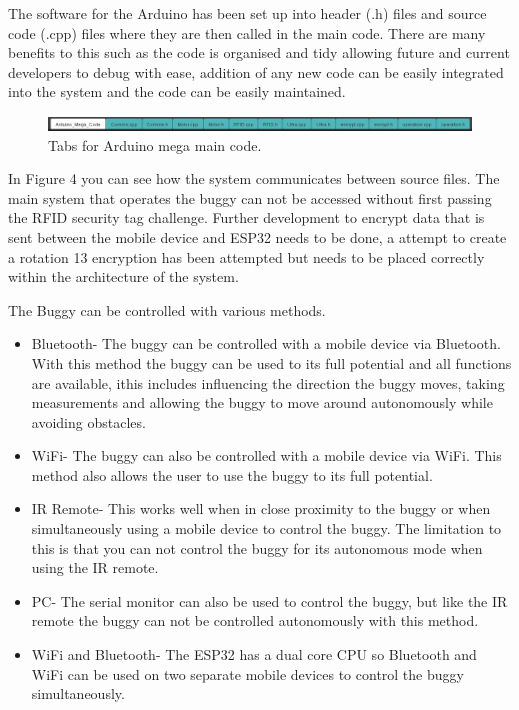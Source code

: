 \documentclass[8pt, a4paper]{article}
\begin{document}
The software for the Arduino has been set up into header (.h) files and source code (.cpp) files where they are then called in the main code. There are many benefits to this such as the code is organised and tidy allowing future and current developers to debug with ease, addition of any new code can be easily integrated into the system and the code can be easily maintained. 

\begin{figure}[H]
	\includegraphics[width=17cm]{tabs}
	\caption{Tabs for Arduino mega main code.}
\end{figure}

In Figure 4 you can see how the system communicates between source files. The main system that operates the buggy can not be accessed without first passing the RFID security tag challenge. Further development to encrypt data that is sent between the mobile device and ESP32 needs to be done, a attempt to create a rotation 13 encryption has been attempted but needs to be placed correctly within the architecture of the system. 

The Buggy can be controlled with various methods.
\begin{itemize}
	\item Bluetooth- The buggy can be controlled with a mobile device via Bluetooth. With this method the buggy can be used to its full potential and all functions are available, ithis includes influencing the direction the buggy moves, taking measurements and allowing the buggy to move around autonomously while avoiding obstacles. 
	\item WiFi- The buggy can also be controlled with a mobile device via WiFi. This method also allows the user to use the buggy to its full potential. 
	\item IR Remote- This works well when in close proximity to the buggy or when simultaneously using a mobile device to control the buggy. The limitation to this is that you can not control the buggy for its autonomous mode when using the IR remote.
	\item PC- The serial monitor can also be used to control the buggy, but like the IR remote the buggy can not be controlled autonomously with this method. 
	\item WiFi and Bluetooth- The ESP32 has a dual core CPU so Bluetooth and WiFi can be used on two separate mobile devices to control the buggy simultaneously.  
\end{itemize}	
\end{document}
